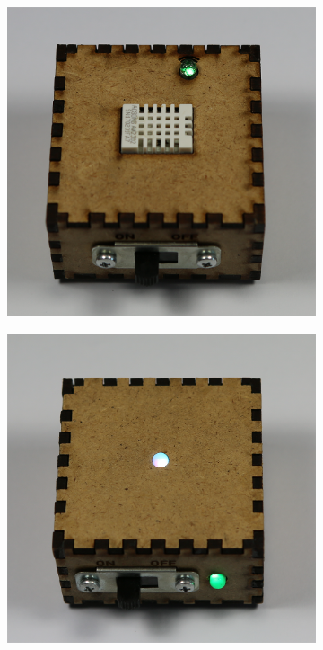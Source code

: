 \begin{figure}[h]
    \centering
    \begin{subfigure}[b]{0.3\textwidth}
        \includegraphics[width=1\linewidth]{bilder/chapter1/DHT22.png}
        \caption{}
        \label{fig:gull}
    \end{subfigure}
    \quad
    \begin{subfigure}[b]{0.3\textwidth}
        \includegraphics[width=1\linewidth]{bilder/chapter1/LED.png}

\end{subfigure}
\end{figure}
